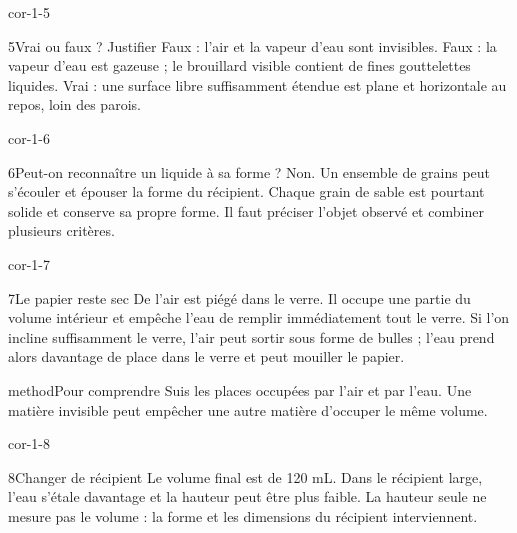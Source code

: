\documentclass[12pt,twoside,openany]{book}
\begin{document}
\begin{blocLivre}{cor-1-5}
\begin{corrige}{5}{Vrai ou faux ? Justifier}
Faux : l’air et la vapeur d’eau sont invisibles. Faux : la vapeur d’eau est gazeuse ; le brouillard visible contient de fines gouttelettes liquides. Vrai : une surface libre suffisamment étendue est plane et horizontale au repos, loin des parois.\par
\end{corrige}\end{blocLivre}
\begin{blocLivre}{cor-1-6}
\begin{corrige}{6}{Peut-on reconnaître un liquide à sa forme ?}
Non. Un ensemble de grains peut s’écouler et épouser la forme du récipient. Chaque grain de sable est pourtant solide et conserve sa propre forme. Il faut préciser l’objet observé et combiner plusieurs critères.\par
\end{corrige}\end{blocLivre}
\begin{blocLivre}{cor-1-7}
\begin{corrige}{7}{Le papier reste sec}
De l’air est piégé dans le verre. Il occupe une partie du volume intérieur et empêche l’eau de remplir immédiatement tout le verre. Si l’on incline suffisamment le verre, l’air peut sortir sous forme de bulles ; l’eau prend alors davantage de place dans le verre et peut mouiller le papier.\par
\begin{pcEncadre}{method}{Pour comprendre}
Suis les places occupées par l’air et par l’eau. Une matière invisible peut empêcher une autre matière d’occuper le même volume.\par
\end{pcEncadre}
\end{corrige}\end{blocLivre}
\begin{blocLivre}{cor-1-8}
\begin{corrige}{8}{Changer de récipient}
Le volume final est de 120 mL. Dans le récipient large, l’eau s’étale davantage et la hauteur peut être plus faible. La hauteur seule ne mesure pas le volume : la forme et les dimensions du récipient interviennent.\par
{}
\end{corrige}\end{blocLivre}
\end{document}
